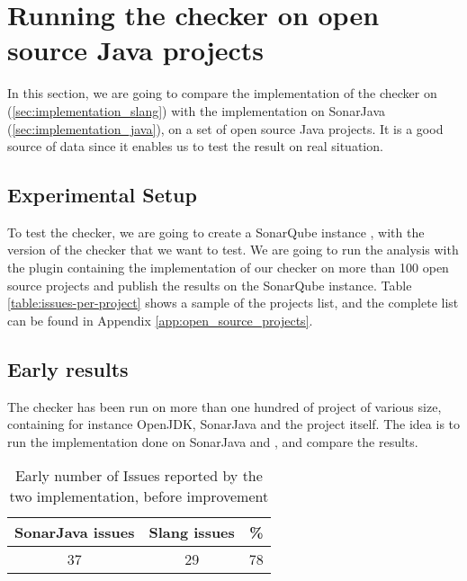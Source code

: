 \section{Running the checker on open source Java projects}
\label{sec:running_checker}

In this section, we are going to compare the implementation of the checker on \slang (\ref{sec:implementation_slang}) with the implementation on SonarJava (\ref{sec:implementation_java}), on a set of open source Java projects. It is a good source of data since it enables us to test the result on real situation.

\subsection{Experimental Setup}
\label{subsec:experimental_setup}

To test the checker, we are going to create a SonarQube instance \cite{SonarQube:2019:Online}, with the version of the checker that we want to test. We are going to run the analysis with the plugin containing the implementation of our checker on more than 100 open source projects and publish the results on the SonarQube instance. Table \ref{table:issues-per-project} shows a sample of the projects list, and the complete list can be found in Appendix \ref{app:open_source_projects}.

\subsection{Early results}
\label{subsec:early_results}

The checker has been run on more than one hundred of project of various size, containing for instance OpenJDK, SonarJava and the \slang project itself. 
The idea is to run the implementation done on SonarJava and \slang, and compare the results.

\begin{table}[h]
	\centering
	\caption{Early number of Issues reported by the two implementation, before improvement}
	\label{table:early-sonarjava-vs-slang}
	\begin{tabular}{|c|c|c|}
		\hline
		\bf SonarJava issues & \bf Slang issues & \bf \% \\ \hline
		37 &  29 &  78 \\ \hline
	\end{tabular}
\end{table}



